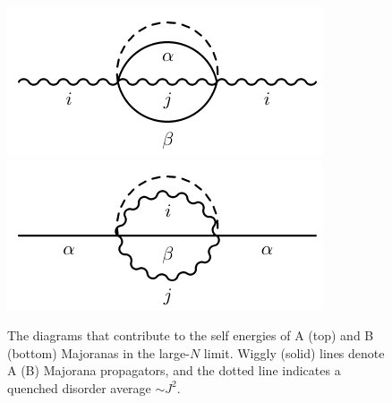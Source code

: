 \begin{figure}
	\centering
	\includegraphics[width=0.8\columnwidth]{figures/chapter1/GA.pdf}
	\includegraphics[width=0.8\columnwidth]{figures/chapter1/GB.pdf}
	\caption{The diagrams that contribute to the self energies of A (top) and B (bottom) Majoranas in the large-$N$ limit. Wiggly (solid) lines denote A (B) Majorana propagators,
		and the dotted line indicates a quenched disorder average $\sim J^2$.}
	\label{fig:GreensFunction}
\end{figure}


